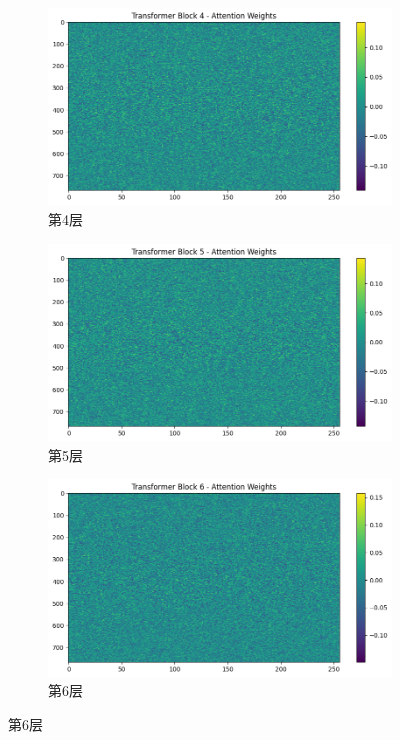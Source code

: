 \begin{figure}[H]
    \vfill

    \begin{subfigure}{0.3\textwidth}
        \includegraphics[width=\linewidth]{../output/transformer/no scheduler/Transformer Block 4 Attention Weights.png}
        \caption{第4层}
        \label{fig:transformerblock4attentionweightsnoscheduler}
    \end{subfigure}
    \hfill
    \begin{subfigure}{0.3\textwidth}
        \includegraphics[width=\linewidth]{../output/transformer/no scheduler/Transformer Block 5 Attention Weights.png}
        \caption{第5层}
        \label{fig:transformerblock5attentionweightsnoscheduler}
    \end{subfigure}
    \hfill
    \begin{subfigure}{0.3\textwidth}
        \includegraphics[width=\linewidth]{../output/transformer/no scheduler/Transformer Block 6 Attention Weights.png}
        \caption{第6层}
        \label{fig:transformerblock6attentionweightsnoscheduler}
    \end{subfigure}


\end{figure}
